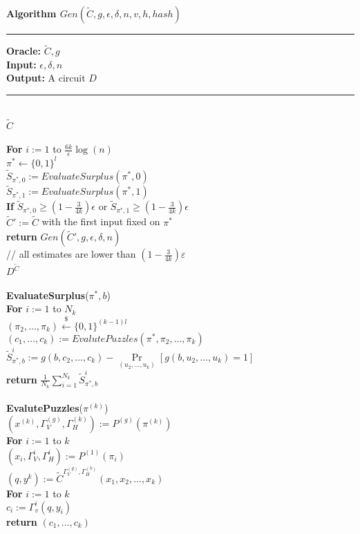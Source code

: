 %
%
\begin{codeblock}
  \textbf{Algorithm $Gen(\widetilde{C},g,\epsilon,\delta,n, v, h, hash)$}
  \medskip

  \hrule

  \medskip

  \textbf{Oracle:} $\widetilde{C}, g$ \\
  \textbf{Input:}  $\epsilon, \delta, n$\\
  \textbf{Output:} A circuit $D$

  \medskip\hrule\medskip
  \If {} \then \\
  \IndI \return $\widetilde{C}$ \\ \\
  \textbf{For} $i:=1$ to $\frac{6k}{\epsilon}\log(n)$ \\
  \IndI $\pi^* \leftarrow \{0,1\}^{l}$\\
  \IndI $\widetilde{S}_{\pi^*,0} := EvaluateSurplus(\pi^*, 0)$\\
  \IndI $\widetilde{S}_{\pi^*,1} := EvaluateSurplus(\pi^*, 1)$\\
  \IndI \textbf{If} $\widetilde{S}_{\pi^*,0} \geq (1 - \frac{3}{4k}) \epsilon$ or $\widetilde{S}_{\pi^*,1} \geq (1 - \frac{3}{4k}) \epsilon$ \\
  \IndII $\widetilde{C}' := \widetilde{C}$ with the first input fixed on $\pi^*$\\
  \IndII\textbf{return} $Gen(\widetilde{C}', g, \epsilon, \delta, n)$ \\
  // all estimates are lower than $(1-\frac{3}{4k})\varepsilon$\\
  \return $D^{\widetilde{C}}$ \\
  \\
  \textbf{EvaluateSurplus}($\pi^*, b$) \\
  \IndI \textbf{For} $i:=1$ to $N_k$ \\
  \IndII $(\pi_2, \dots, \pi_k) \xleftarrow{\$} \{0,1\}^{(k-1)l}$\\
  \IndII $(c_1, \dots, c_k) := EvalutePuzzles(\pi^*, \pi_2, \dots, \pi_k)$\\
  \IndII $\widetilde{S}_{\pi^*,b}^i := g(b, c_2, \dots, c_k) - \underset{(u_2, \dots, u_k)}{\Pr}[g(b, u_2, \dots, u_k) = 1] $\\
  \IndI \textbf{return} $\frac{1}{N_k} \sum_{i=1}^{N_k} \widetilde{S}_{\pi^*,b}^i$\\
  \\
  \textbf{EvalutePuzzles}($\pi^{(k)}$)\\
  \IndI $(x^{(k)}, \Gamma_V^{(g)}, \Gamma_H^{(k)}) := P^{(g)}(\pi^{(k)})$ \\
  \IndI \textbf{For} $i:=1$ to $k$\\
  \IndII $(x_i, \Gamma_V^{i}, \Gamma_H^{i}) := P^{(1)}(\pi_i)$\\
  \IndI $(q,y^{k}) := \widetilde{C}^{\Gamma_V^{(g)}, \Gamma_H^{(k)}}(x_1, x_2, \dots, x_k)$\\
  \IndI \textbf{For} $i:=1$ to $k$\\
  \IndII $c_i := \Gamma_v^{i}(q, y_i)$\\
  \IndI \textbf{return} $(c_1, \dots, c_k)$\\
\end{codeblock}

